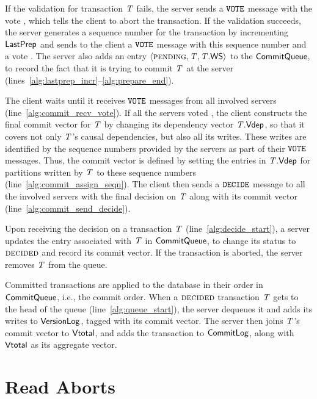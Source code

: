 If the validation for transaction $\mathit{T}$ fails, the server sends a ${\tt VOTE}$ message with the vote \abort, which tells the client to abort the transaction. If the validation succeeds, the server generates a sequence number for the transaction by incrementing $\mathsf{LastPrep}$ and sends to the client a ${\tt VOTE}$ message with this sequence number and a vote \commit. The server also adds an entry $\langle \text{\sc pending}, \mathit{T}, \mathit{T}.\mathsf{WS} \rangle$ to the $\mathsf{CommitQueue}$, to record the fact that it is trying to commit $\mathit{T}$ at the server (lines~\ref{alg:lastprep_incr}--\ref{alg:prepare_end}).

The client waits until it receives ${\tt VOTE}$ messages from all involved servers (line~\ref{alg:commit_recv_vote}). If all the servers voted \commit, the client constructs the final commit vector for $\mathit{T}$ by changing its dependency vector $\mathit{T}.\mathsf{Vdep}$, so that it covers not only $\mathit{T}$'s causal dependencies, but also all its writes. These writes are identified by the sequence numbers provided by the servers as part of their ${\tt VOTE}$ messages. Thus, the commit vector is defined by setting the entries in $\mathit{T}.\mathsf{Vdep}$ for partitions written by $\mathit{T}$ to these sequence numbers (line~\ref{alg:commit_assign_seqn}). The client then sends a ${\tt DECIDE}$ message to all the involved servers with the final decision on $\mathit{T}$ along with its commit vector (line~\ref{alg:commit_send_decide}).

Upon receiving the decision on a transaction $\mathit{T}$ (line~\ref{alg:decide_start}), a server updates the entry associated with $\mathit{T}$ in $\mathsf{CommitQueue}$, to change its status to $\text{\sc decided}$ and record its commit vector. If the transaction is aborted, the server removes $\mathit{T}$ from the queue.

Committed transactions are applied to the database in their order in $\mathsf{CommitQueue}$, i.e., the commit order. When a $\text{\sc decided}$ transaction $\mathit{T}$ gets to the head of the queue (line~\ref{alg:queue_start}), the server dequeues it and adds its writes to $\mathsf{VersionLog}$, tagged with its commit vector. The server then joins $\mathit{T}$'s commit vector to $\mathsf{Vtotal}$, and adds the transaction to $\mathsf{CommitLog}$, along with $\mathsf{Vtotal}$ as its aggregate vector.

\clearpage

\section{Read Aborts}


